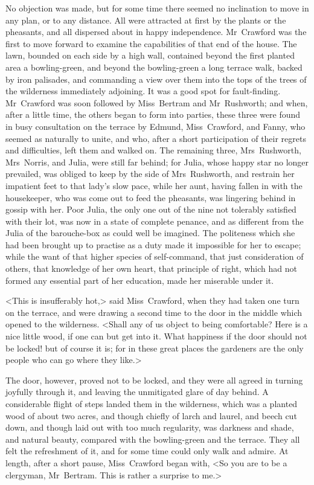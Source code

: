 No objection was made, but for some time there seemed no inclination to move in any plan, or to any distance. All were attracted at first by the plants or the pheasants, and all dispersed about in happy independence. Mr~Crawford was the first to move forward to examine the capabilities of that end of the house. The lawn, bounded on each side by a high wall, contained beyond the first planted area a bowling-green, and beyond the bowling-green a long terrace walk, backed by iron palisades, and commanding a view over them into the tops of the trees of the wilderness immediately adjoining. It was a good spot for fault-finding. Mr~Crawford was soon followed by Miss~Bertram and Mr~Rushworth; and when, after a little time, the others began to form into parties, these three were found in busy consultation on the terrace by Edmund, Miss~Crawford, and Fanny, who seemed as naturally to unite, and who, after a short participation of their regrets and difficulties, left them and walked on. The remaining three, Mrs~Rushworth, Mrs~Norris, and Julia, were still far behind; for Julia, whose happy star no longer prevailed, was obliged to keep by the side of Mrs~Rushworth, and restrain her impatient feet to that lady's slow pace, while her aunt, having fallen in with the housekeeper, who was come out to feed the pheasants, was lingering behind in gossip with her. Poor Julia, the only one out of the nine not tolerably satisfied with their lot, was now in a state of complete penance, and as different from the Julia of the barouche-box as could well be imagined. The politeness which she had been brought up to practise as a duty made it impossible for her to escape; while the want of that higher species of self-command, that just consideration of others, that knowledge of her own heart, that principle of right, which had not formed any essential part of her education, made her miserable under it.

<This is insufferably hot,> said Miss~Crawford, when they had taken one turn on the terrace, and were drawing a second time to the door in the middle which opened to the wilderness. <Shall any of us object to being comfortable? Here is a nice little wood, if one can but get into it. What happiness if the door should not be locked! but of course it is; for in these great places the gardeners are the only people who can go where they like.>

The door, however, proved not to be locked, and they were all agreed in turning joyfully through it, and leaving the unmitigated glare of day behind. A considerable flight of steps landed them in the wilderness, which was a planted wood of about two acres, and though chiefly of larch and laurel, and beech cut down, and though laid out with too much regularity, was darkness and shade, and natural beauty, compared with the bowling-green and the terrace. They all felt the refreshment of it, and for some time could only walk and admire. At length, after a short pause, Miss~Crawford began with, <So you are to be a clergyman, Mr~Bertram. This is rather a surprise to me.>

